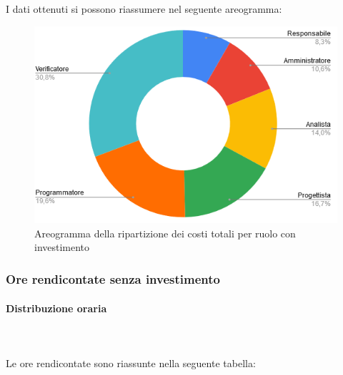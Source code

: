 I dati ottenuti si possono riassumere nel seguente areogramma:
\begin{figure}[H]
\centering
\includegraphics[scale=0.60]{img/grafici/torta_tot_con_analisi.png}
\caption{Areogramma della ripartizione dei costi totali per ruolo con investimento}
\end{figure}

\subsubsection{Ore rendicontate senza investimento}
\paragraph{Distribuzione oraria} \mbox{} \\ \mbox{} \\
Le ore rendicontate sono riassunte nella seguente tabella:

